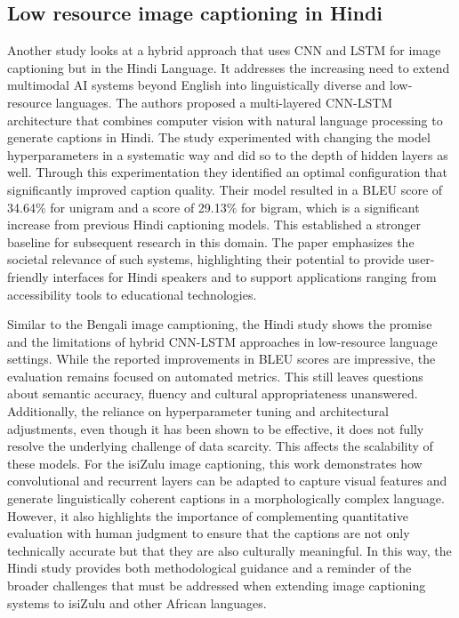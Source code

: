 \documentclass{article}
\begin{document}
\subsection{Low resource image captioning in Hindi}
Another study looks at a hybrid approach that uses CNN and LSTM for image captioning but in the Hindi Language. It addresses the increasing need to extend multimodal AI systems beyond English into linguistically diverse and low-resource languages. The authors proposed a multi-layered CNN-LSTM architecture that combines computer vision with natural language processing to generate captions in Hindi. The study experimented with changing the model hyperparameters in a systematic way and did so to the depth of hidden layers as well. Through this experimentation they identified an optimal configuration that significantly improved caption quality. Their model resulted in a BLEU score of 34.64\% for unigram and a score of 29.13\% for bigram, which is a significant increase from previous Hindi captioning models. This established a stronger baseline for subsequent research in this domain. The paper emphasizes the societal relevance of such systems, highlighting their potential to provide user-friendly interfaces for Hindi speakers and to support applications ranging from accessibility tools to educational technologies\cite{poddar2023hybrid}.

Similar to the Bengali image camptioning, the Hindi study shows the promise and the limitations of hybrid CNN-LSTM approaches in low-resource language settings. While the reported improvements in BLEU scores are impressive, the evaluation remains focused on automated metrics. This still leaves questions about semantic accuracy, fluency and cultural appropriateness unanswered. Additionally, the reliance on hyperparameter tuning and architectural adjustments, even though it has been shown to be effective, it does not fully resolve the underlying challenge of data scarcity. This affects the scalability of these models. For the isiZulu image captioning, this work demonstrates how convolutional and recurrent layers can be adapted to capture visual features and generate linguistically coherent captions in a morphologically complex language. However, it also highlights the importance of complementing quantitative evaluation with human judgment to ensure that the captions are not only technically accurate but that they are also culturally meaningful. In this way, the Hindi study provides both methodological guidance and a reminder of the broader challenges that must be addressed when extending image captioning systems to isiZulu and other African languages.
\end{document}

